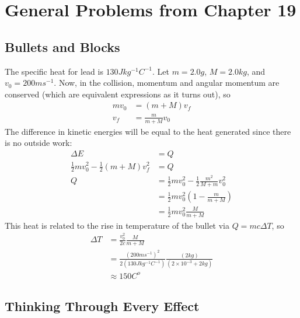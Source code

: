 \documentclass{article}
\begin{document}
\newpage

\section{General Problems from Chapter 19}

\subsection{Bullets and Blocks}

The specific heat for lead is $130 J kg^{-1} C^{-1}$. Let $m = 2.0 g$, $M = 2.0 kg$, and $v_0 = 200 ms^{-1}$. Now, in the collision, momentum and angular momentum are conserved (which are equivalent expressions as it turns out), so
\begin{align*}
mv_0 &= (m+M)v_f \\
v_f &= \frac{m}{m+M}v_0
\end{align*}
The difference in kinetic energies will be equal to the heat generated since there is no outside work:
\begin{align*}
\Delta E &= Q \\
\frac{1}{2}mv_0^2 - \frac{1}{2}(m+M)v_f^2 &= Q \\
Q &= \frac{1}{2}mv_0^2 - \frac{1}{2}\frac{m^2}{M+m}v_0^2 \\
&= \frac{1}{2}mv_0^2\left(1-\frac{m}{m+M}\right) \\
&= \frac{1}{2}mv_0^2\frac{M}{m+M}
\end{align*}
This heat is related to the rise in temperature of the bullet via $Q = mc\Delta T$, so
\begin{align*}
\Delta T &= \frac{v_0^2}{2c}\frac{M}{m+M} \\
&= \frac{(200 ms^{-1})^2}{2(130 J kg^{-1}C^{-1})}\frac{(2 kg)}{(2\times10^{-3} + 2 kg)} \\
&\approx 150 C^o
\end{align*}

\subsection{Thinking Through Every Effect}
\end{document}
